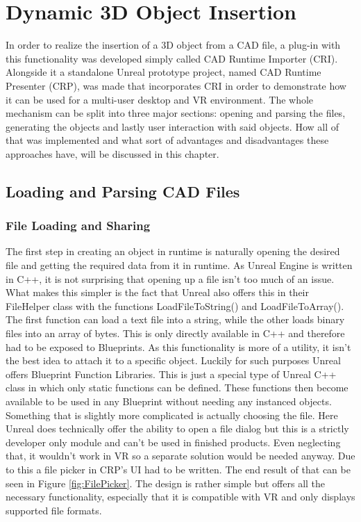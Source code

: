 \chapter{Dynamic 3D Object Insertion}\label{chp:ObjectLoading}

In order to realize the insertion of a 3D object from a \acs{CAD} file, a plug-in with this functionality was developed simply called CAD Runtime Importer (\acs{CRI}). Alongside it a standalone Unreal prototype project, named CAD Runtime Presenter (\acs{CRP}), was made that incorporates \acs{CRI} in order to demonstrate how it can be used for a multi-user desktop and VR environment. The whole mechanism can be split into three major sections: opening and parsing the files, generating the objects and lastly user interaction with said objects. How all of that was implemented and what sort of advantages and disadvantages these approaches have, will be discussed in this chapter.
\section{Loading and Parsing CAD Files}
\subsection{File Loading and Sharing}
The first step in creating an object in runtime is naturally opening the desired file and getting the required data from it in runtime. As Unreal Engine is written in C++, it is not surprising that opening up a file isn't too much of an issue. What makes this simpler is the fact that Unreal also offers this in their FileHelper class with the functions LoadFileToString() and LoadFileToArray(). The first function can load a text file into a string, while the other loads binary files into an array of bytes. This is only directly available in C++ and therefore had to be exposed to Blueprints. As this functionality is more of a utility, it isn't the best idea to attach it to a specific object. Luckily for such purposes Unreal offers Blueprint Function Libraries\cite{bib:UEBFL}. This is just a special type of Unreal C++ class in which only static functions can be defined. These functions then become available to be used in any Blueprint without needing any instanced objects.\\
Something that is slightly more complicated is actually choosing the file. Here Unreal does technically offer the ability to open a file dialog but this is a strictly developer only module and can't be used in finished products\cite{bib:DeskPlat}. Even neglecting that, it wouldn't work in VR so a separate solution would be needed anyway. Due to this a file picker in CRP's UI had to be written. The end result of that can be seen in Figure \ref{fig:FilePicker}. The design is rather simple but offers all the necessary functionality, especially that it is compatible with VR and only displays supported file formats.\\

